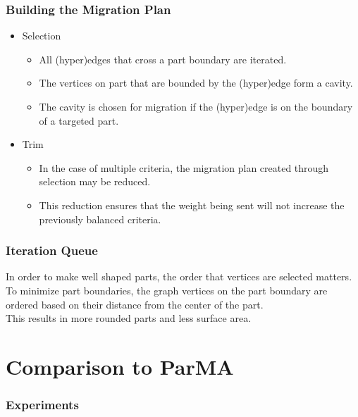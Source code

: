 \documentclass{beamer}
\begin{document}
\begin{frame}
  \frametitle{Building the Migration Plan}
  \begin{itemize}
  \item Selection
    \begin{itemize}
    \item All (hyper)edges that cross a part boundary are iterated.
    \item The vertices on part that are bounded by the (hyper)edge form a cavity.
    \item The cavity is chosen for migration if the (hyper)edge is on the boundary of a targeted part.
    \end{itemize}
  \item Trim
    \begin{itemize}
    \item In the case of multiple criteria, the migration plan created through selection may be reduced.
    \item This reduction ensures that the weight being sent will not increase the previously balanced criteria.
    \end{itemize}
  \end{itemize}
  
\end{frame}


\begin{frame}
  \frametitle{Iteration Queue}
  In order to make well shaped parts, the order that vertices are selected matters. \\
  \bigskip
  To minimize part boundaries, the graph vertices on the part boundary are ordered based on their distance from the center of the part. \\
  \bigskip
  This results in more rounded parts and less surface area. 
\end{frame}


\section{Comparison to ParMA}

\begin{frame}
  \frametitle{Experiments}
\end{frame}

\end{document}
